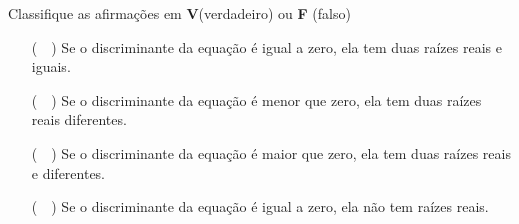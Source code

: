 \begin{question} 
Classifique as afirmações em \textbf{V}(verdadeiro) ou \textbf{F} (falso)

\begin{itemize}
    \item [(~~)] Se o discriminante da equação é igual a zero, ela tem duas raízes reais e iguais.
    \item [(~~)] Se o discriminante da equação é menor que zero, ela tem duas raízes reais diferentes.
    \item [(~~)] Se o discriminante da equação é maior que zero, ela tem duas raízes reais e diferentes.
    \item [(~~)] Se o discriminante da equação é igual a zero, ela não tem raízes reais.
\end{itemize}
\end{question}
